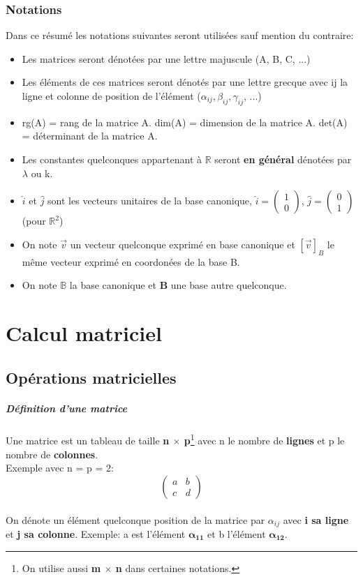 \documentclass[10pt,a4paper]{book}
\newcommand{\R}{\mathbb{R}}
\newcommand{\x}{$\times$ }
\begin{document}
\subsection*{Notations}
Dans ce résumé les notations suivantes seront utilisées sauf mention du contraire:
\begin{itemize}
\item Les matrices seront dénotées par une lettre majuscule (A, B, C, ...)
\item Les éléments de ces matrices seront dénotés par une lettre grecque avec ij la ligne et colonne de position de l'élément (\(\alpha_{ij}, \beta_{ij}, \gamma_{ij}\), ...)
\item rg(A) = rang de la matrice A. dim(A) = dimension de la matrice A. det(A) = déterminant de la matrice A.
\item Les constantes quelconques appartenant à $\R$ seront \textbf{en général} dénotées par $\lambda$ ou k.
\item $\hat{i}$ et $\hat{j}$ sont les vecteurs unitaires de la base canonique, \(\hat{i} = \left(\begin{array}{c} 1 \\ 0 \end{array}\right)\), \(\hat{j} = \left(\begin{array}{c} 0 \\ 1 \end{array}\right)\) (pour $\R^2$)
\item On note $\vec{v}$ un vecteur quelconque exprimé en base canonique et $[\vec{v}]_B$ le même vecteur exprimé en coordonées de la base B.
\item On note $\mathbb{B}$ la base canonique et \textbf{B} une base autre quelconque. 
\end{itemize}

\chapter{Calcul matriciel}

\section{Opérations matricielles}

\paragraph{Définition d'une matrice} Une matrice est un tableau de taille \textbf{n \x p}\footnote{On utilise aussi \textbf{m \x n} dans certaines notations.} avec n le nombre de \textbf{lignes} et p le nombre de \textbf{colonnes}. \\
Exemple avec n = p = 2:
\[\begin{pmatrix}
a & b \\
c & d
\end{pmatrix}\] \\
On dénote un élément quelconque position de la matrice par $\alpha_{ij}$ avec \textbf{i sa ligne} et \textbf{j sa colonne}. Exemple: a est l'élément $\mathbf{\alpha_{11}}$ et b l'élément $\mathbf{\alpha_{12}}$.
\end{document}
